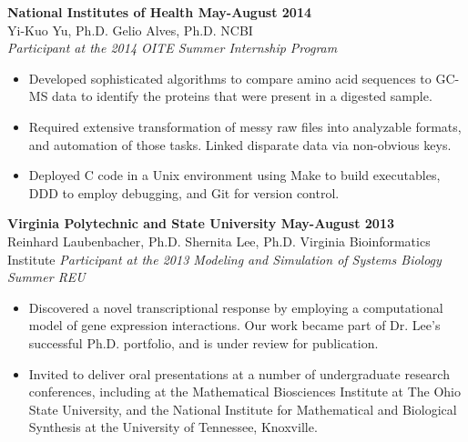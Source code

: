 \documentclass[margin,10pt]{res} %
\newcommand{\CC}{C\nolinebreak\hspace{-.05em}\raisebox{.4ex}{\tiny\bf+}\nolinebreak\hspace{-.10em}\raisebox{.4ex}{\tiny\bf+}}
\begin{document}
\begin{resume}
\textbf{National Institutes of Health \hfill May-August 2014} \\
Yi-Kuo Yu, Ph.D. Gelio Alves, Ph.D. \hfill  NCBI \\
{\sl Participant at the 2014 OITE Summer Internship Program} \\
\begin{itemize} %
\item Developed sophisticated algorithms to compare amino acid sequences to GC-MS data to identify the proteins that were present in a digested sample.
\item Required extensive transformation of messy raw files into analyzable formats, and automation of those tasks. Linked disparate data via non-obvious keys.
\item Deployed \CC{} code in a Unix environment using Make to build executables, DDD to employ debugging, and Git for version control.
\end{itemize}
 
\textbf{Virginia Polytechnic and State University \hfill May-August 2013} \\
Reinhard Laubenbacher, Ph.D. Shernita Lee, Ph.D. Virginia Bioinformatics Institute
{\sl Participant at the 2013 Modeling and Simulation of Systems Biology Summer REU} \\
\begin{itemize} %
\item Discovered a novel transcriptional response by employing a computational
model of gene expression interactions. 
Our work became part of Dr. Lee's successful Ph.D. portfolio, and is under review for publication.
\item Invited to deliver oral presentations at a number of undergraduate research conferences, including at the Mathematical Biosciences Institute at The Ohio State University, and the National Institute for Mathematical and Biological Synthesis at the University of Tennessee, Knoxville.
\end{itemize}


\end{resume}
\end{document}
